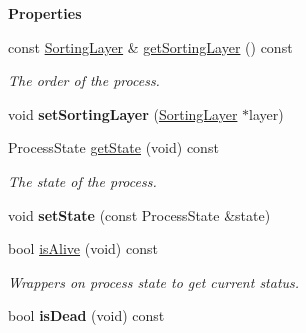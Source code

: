\begin{Indent}\textbf{ Properties}\par
\begin{DoxyCompactItemize}
\item 
\mbox{\label{classrev_1_1_process_a710f0653e21979524a7b941ecfe252f7}} 
const \mbox{\hyperlink{structrev_1_1_sorting_layer}{Sorting\+Layer}} \& \mbox{\hyperlink{classrev_1_1_process_a710f0653e21979524a7b941ecfe252f7}{get\+Sorting\+Layer}} () const
\begin{DoxyCompactList}\small\item\em The order of the process. \end{DoxyCompactList}\item 
\mbox{\label{classrev_1_1_process_a4b667ae9debdfb5ab8eaba534fe647cc}} 
void {\bfseries set\+Sorting\+Layer} (\mbox{\hyperlink{structrev_1_1_sorting_layer}{Sorting\+Layer}} $\ast$layer)
\item 
\mbox{\label{classrev_1_1_process_ae6eb4d34ab83c736370db47c549753cc}} 
Process\+State \mbox{\hyperlink{classrev_1_1_process_ae6eb4d34ab83c736370db47c549753cc}{get\+State}} (void) const
\begin{DoxyCompactList}\small\item\em The state of the process. \end{DoxyCompactList}\item 
\mbox{\label{classrev_1_1_process_a999e48d11c6242bf53929aa0c3320a37}} 
void {\bfseries set\+State} (const Process\+State \&state)
\item 
\mbox{\label{classrev_1_1_process_abb8389abf2efd5e61c90800c92108913}} 
bool \mbox{\hyperlink{classrev_1_1_process_abb8389abf2efd5e61c90800c92108913}{is\+Alive}} (void) const
\begin{DoxyCompactList}\small\item\em Wrappers on process state to get current status. \end{DoxyCompactList}\item 
\mbox{\label{classrev_1_1_process_a75d910c1570a43dd166b5c76a488f578}} 
bool {\bfseries is\+Dead} (void) const
\item 
\mbox{\label{classrev_1_1_process_a1a17b3505d34cc3727c7a6a591c41ee5}} 

\end{DoxyCompactItemize}
\end{Indent}
